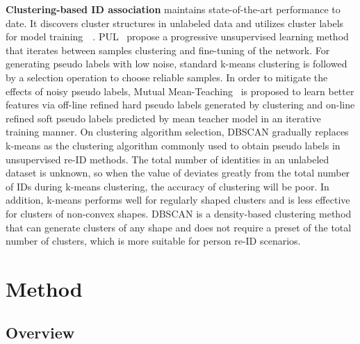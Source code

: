 \documentclass[10pt,twocolumn,letterpaper]{article}
\begin{document}
\noindent \textbf{Clustering-based ID association} maintains state-of-the-art performance to date. It discovers cluster structures in unlabeled data and utilizes cluster labels for model training~\cite{cluster1}~\cite{cluster2}. PUL~\cite{pul} propose a progressive unsupervised learning method that iterates between samples clustering and fine-tuning of the network. For generating pseudo labels with low noise, standard k-means clustering is followed by a selection operation to choose reliable samples. In order to mitigate the effects of noisy pseudo labels, Mutual Mean-Teaching~\cite{mmt} is proposed to learn better features via off-line refined hard pseudo labels generated by clustering and on-line refined soft pseudo labels predicted by mean teacher model in an iterative training manner. On clustering algorithm selection, DBSCAN gradually replaces k-means as the clustering algorithm commonly used to obtain pseudo labels in unsupervised re-ID methods. The total number of identities in an unlabeled dataset is unknown, so when the value of  deviates greatly from the total number of IDs during k-means clustering, the accuracy of clustering will be poor. In addition, k-means performs well for regularly shaped clusters and is 
less effective for clusters of non-convex shapes. DBSCAN is a density-based clustering method that can generate clusters of any shape and does not require a preset of the total number of clusters, which is more suitable for person re-ID scenarios.

\section{Method}

\subsection{Overview}
\end{document}
